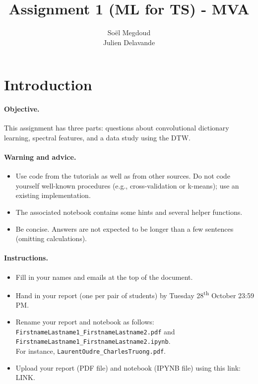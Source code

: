 \documentclass[11pt]{article}
\title{Assignment 1 (ML for TS) - MVA}
\author{
Soël Megdoud \email{Soel.Megdoud@ens-paris-saclay.fr} \\ %
Julien Delavande \email{Julien.Delavande@ens-paris-saclay.fr} %
}
\begin{document}
\maketitle

\section{Introduction}

\paragraph{Objective.} This assignment has three parts: questions about convolutional dictionary learning, spectral features, and a data study using the DTW. 

\paragraph{Warning and advice.} 
\begin{itemize}
    \item Use code from the tutorials as well as from other sources. Do not code yourself well-known procedures (e.g., cross-validation or k-means); use an existing implementation. 
    \item The associated notebook contains some hints and several helper functions.
    \item Be concise. Answers are not expected to be longer than a few sentences (omitting calculations).
\end{itemize}



\paragraph{Instructions.}
\begin{itemize}
    \item Fill in your names and emails at the top of the document.
    \item Hand in your report (one per pair of students) by Tuesday 28\textsuperscript{th} October 23:59 PM.
    \item Rename your report and notebook as follows:\\ \texttt{FirstnameLastname1\_FirstnameLastname2.pdf} and\\ \texttt{FirstnameLastname1\_FirstnameLastname2.ipynb}.\\
    For instance, \texttt{LaurentOudre\_CharlesTruong.pdf}.
    \item Upload your report (PDF file) and notebook (IPYNB file) using this link: \footnotesize{LINK}.
\end{itemize}
\end{document}
